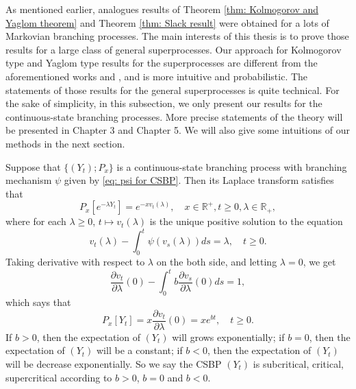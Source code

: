 \documentclass[UTF8]{pkuthss}
\theoremstyle{plain}
\theoremstyle{definition}
\numberwithin{equation}{section}
\begin{document}
	As mentioned earlier, analogues results of Theorem \ref{thm: Kolmogorov and Yaglom theorem} and Theorem \ref{thm: Slack result} were obtained for a lots of Markovian branching processes. 
	The main interests of this thesis is to prove those results for a large class of general superprocesses. Our approach for Kolmogorov type and Yaglom type results for the superprocesses are different from the aforementioned works \cite{EvansPerkins1990Measure-valued} and \cite{RenSongZhang2015Limit}, and is more intuitive and probabilistic. 
	The statements of those results for the general superprocesses is quite technical. For the sake of simplicity, in this subsection, we only present our results for the continuous-state branching processes. 
	More precise statements of the theory will be presented in Chapter 3 and Chapter 5. 
	We will also give some intuitions of our methods in the next section.

	Suppose that $\{(Y_t);P_x\}$ is a continuous-state branching process with branching mechanism $\psi$ given by \eqref{eq: psi for CSBP}. Then its Laplace transform satisfies that
\[
	P_x[e^{-\lambda Y_t}] = e^{-xv_t(\lambda)}, \quad x\in \mathbb R^+, t\geq 0, \lambda \in \mathbb R_+,
\]
	where for each $\lambda \geq 0$, $t\mapsto v_t(\lambda)$ is the unique positive solution to the equation
\[
	v_t(\lambda) - \int_0^t \psi(v_s(\lambda))ds = \lambda,\quad t\geq 0.
\]
	Taking derivative with respect to $\lambda$ on the both side, and letting $\lambda = 0$, we get
\[
	\frac{\partial v_t}{\partial \lambda}(0) - \int_0^t b \frac{\partial v_s}{\partial \lambda}(0) ds
	= 1,
\]
	which says that
\[
	P_x[Y_t] = x\frac{\partial v_t}{\partial \lambda}(0) =x e^{bt},\quad t\geq 0.
\]
	If $b > 0$, then the expectation of $(Y_t)$ will grows exponentially; if $b=0$, then the expectation of $(Y_t)$ will be a constant; if $b< 0$, then the expectation of $(Y_t)$ will be decrease exponentially. 
	So we say the CSBP $(Y_t)$ is subcritical, critical, supercritical according to $b>0$, $b=0$ and $b <0$.  
\end{document}
